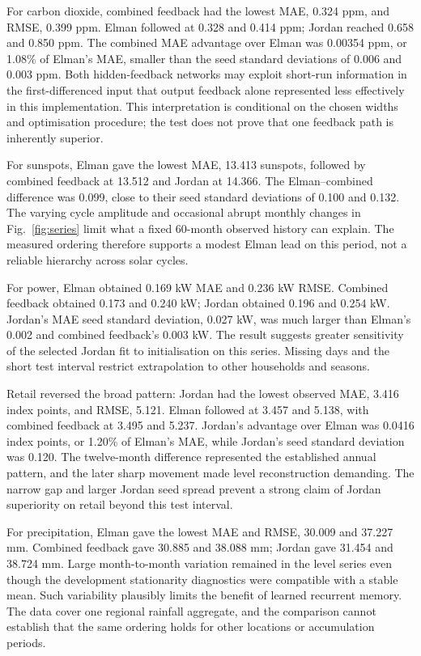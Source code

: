 For carbon dioxide, combined feedback had the lowest MAE, 0.324 ppm, and RMSE, 0.399 ppm. Elman followed at 0.328 and 0.414 ppm; Jordan reached 0.658 and 0.850 ppm. The combined MAE advantage over Elman was 0.00354 ppm, or 1.08\% of Elman's MAE, smaller than the seed standard deviations of 0.006 and 0.003 ppm. Both hidden-feedback networks may exploit short-run information in the first-differenced input that output feedback alone represented less effectively in this implementation. This interpretation is conditional on the chosen widths and optimisation procedure; the test does not prove that one feedback path is inherently superior.

For sunspots, Elman gave the lowest MAE, 13.413 sunspots, followed by combined feedback at 13.512 and Jordan at 14.366. The Elman--combined difference was 0.099, close to their seed standard deviations of 0.100 and 0.132. The varying cycle amplitude and occasional abrupt monthly changes in Fig.~\ref{fig:series} limit what a fixed 60-month observed history can explain. The measured ordering therefore supports a modest Elman lead on this period, not a reliable hierarchy across solar cycles.

For power, Elman obtained 0.169 kW MAE and 0.236 kW RMSE. Combined feedback obtained 0.173 and 0.240 kW; Jordan obtained 0.196 and 0.254 kW. Jordan's MAE seed standard deviation, 0.027 kW, was much larger than Elman's 0.002 and combined feedback's 0.003 kW. The result suggests greater sensitivity of the selected Jordan fit to initialisation on this series. Missing days and the short test interval restrict extrapolation to other households and seasons.

Retail reversed the broad pattern: Jordan had the lowest observed MAE, 3.416 index points, and RMSE, 5.121. Elman followed at 3.457 and 5.138, with combined feedback at 3.495 and 5.237. Jordan's advantage over Elman was 0.0416 index points, or 1.20\% of Elman's MAE, while Jordan's seed standard deviation was 0.120. The twelve-month difference represented the established annual pattern, and the later sharp movement made level reconstruction demanding. The narrow gap and larger Jordan seed spread prevent a strong claim of Jordan superiority on retail beyond this test interval.

For precipitation, Elman gave the lowest MAE and RMSE, 30.009 and 37.227 mm. Combined feedback gave 30.885 and 38.088 mm; Jordan gave 31.454 and 38.724 mm. Large month-to-month variation remained in the level series even though the development stationarity diagnostics were compatible with a stable mean. Such variability plausibly limits the benefit of learned recurrent memory. The data cover one regional rainfall aggregate, and the comparison cannot establish that the same ordering holds for other locations or accumulation periods.


